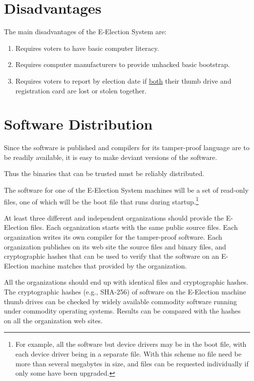 \documentclass[12pt]{article}
\begin{document}
\section{Disadvantages}

The main disadvantages of the E-Election System are:
\begin{enumerate}
\item Requires voters to have basic computer literacy.
\item Requires computer manufacturers to provide unhacked basic
      bootstrap.
\item Requires voters to report by election date
      if \underline{both} their
      thumb drive and registration card are lost or stolen
      together.
\end{enumerate}

\section{Software Distribution}\label{SOFTWARE-DISTRIBUTION}

Since the software is published and compilers for its tamper-proof
language are to be readily available, it is easy to make deviant
versions of the software.\label{DEVIANT-SOFTWARE}

Thus the binaries that can be trusted must be reliably distributed.

The software for one of the E-Election
System machines will be a set of read-only files, one of which will be
the boot file that runs during startup.\footnote{For example, all
the software but device drivers may be in the boot file, with each
device driver being in a separate file.  With this scheme no file
need be more than several megabytes in size, and files can be
requested individually if only some have been upgraded.}

At least three different and independent organizations should provide
the E-Election files.  Each organization starts with the same public
source files.  Each organization writes its own compiler for the
tamper-proof software.  Each organization publishes on its web site
the source files and binary files, and cryptographic hashes that
can be used to verify that the software on an E-Election machine
matches that provided by the organization.

All the organizations should end up with identical files and
cryptographic hashes.  The cryptographic hashes (e.g., SHA-256)
of software on the E-Election machine thumb drives can be checked
by widely available commodity software running under commodity
operating systems.  Results can be compared with the hashes on
all the organization web sites.
\end{document}

